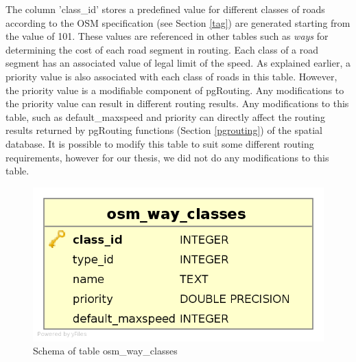 The column 'class{\_}id' stores a predefined value for different classes of roads according to the OSM specification (see Section \ref{tag}) are generated starting from the value of 101. These values are referenced in other tables such as \textit{ways} for determining the cost of each road segment in routing. Each class of a road segment has an associated value of legal limit of the speed. As explained earlier, a priority value is also associated with each class of roads in this table. However, the priority value is a modifiable component of pgRouting. Any modifications to the priority value can result in different routing results. Any modifications to this table, such as default{\_}maxspeed and priority can directly affect the routing results returned by pgRouting functions (Section \ref{pgrouting}) of the spatial database. It is possible to modify this table to suit some different routing requirements, however for our thesis, we did not do any modifications to this table.  
\begin{figure}
\includegraphics[scale=.31]{osmwayclasses.png}
\caption{Schema of table osm{\_}way{\_}classes}
\label{fg:osmwayclasses}
\end{figure}





